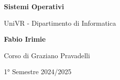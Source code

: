 \begin{titlepage}
	\begin{center}
		\vspace*{1cm}

		\Huge
		\textbf{Sistemi Operativi}

		\vspace{0.5cm}
		\LARGE
		UniVR - Dipartimento di Informatica

		\vspace{1.5cm}

		\textbf{Fabio Irimie}

		\vfill


		\vspace{0.8cm}

    Corso di Graziano Pravadelli

		1° Semestre 2024/2025

	\end{center}
\end{titlepage}
